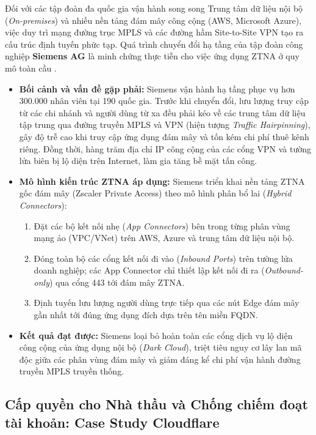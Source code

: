 Đối với các tập đoàn đa quốc gia vận hành song song Trung tâm dữ liệu nội bộ (\textit{On-premises}) và nhiều nền tảng đám mây công cộng (AWS, Microsoft Azure), việc duy trì mạng đường trục MPLS và các đường hầm Site-to-Site VPN tạo ra cấu trúc định tuyến phức tạp. Quá trình chuyển đổi hạ tầng của tập đoàn công nghiệp \textbf{Siemens AG} là minh chứng thực tiễn cho việc ứng dụng ZTNA ở quy mô toàn cầu \cite{gartner2022}.

\begin{itemize}
    \item \textbf{Bối cảnh và vấn đề gặp phải:} Siemens vận hành hạ tầng phục vụ hơn 300.000 nhân viên tại 190 quốc gia. Trước khi chuyển đổi, lưu lượng truy cập từ các chi nhánh và người dùng từ xa đều phải kéo về các trung tâm dữ liệu tập trung qua đường truyền MPLS và VPN (hiện tượng \textit{Traffic Hairpinning}), gây độ trễ cao khi truy cập ứng dụng đám mây và tốn kém chi phí thuê kênh riêng. Đồng thời, hàng trăm địa chỉ IP công cộng của các cổng VPN và tường lửa biên bị lộ diện trên Internet, làm gia tăng bề mặt tấn công.
    \item \textbf{Mô hình kiến trúc ZTNA áp dụng:} Siemens triển khai nền tảng ZTNA gốc đám mây (Zscaler Private Access) theo mô hình phân bổ lai (\textit{Hybrid Connectors}):
    \begin{enumerate}
        \item Đặt các bộ kết nối nhẹ (\textit{App Connectors}) bên trong từng phân vùng mạng ảo (VPC/VNet) trên AWS, Azure và trung tâm dữ liệu nội bộ.
        \item Đóng toàn bộ các cổng kết nối đi vào (\textit{Inbound Ports}) trên tường lửa doanh nghiệp; các App Connector chỉ thiết lập kết nối đi ra (\textit{Outbound-only}) qua cổng 443 tới đám mây ZTNA.
        \item Định tuyến lưu lượng người dùng trực tiếp qua các nút Edge đám mây gần nhất tới đúng ứng dụng đích dựa trên tên miền FQDN.
    \end{enumerate}
    \item \textbf{Kết quả đạt được:} Siemens loại bỏ hoàn toàn các cổng dịch vụ lộ diện công cộng của ứng dụng nội bộ (\textit{Dark Cloud}), triệt tiêu nguy cơ lây lan mã độc giữa các phân vùng đám mây và giảm đáng kể chi phí vận hành đường truyền MPLS truyền thống.
\end{itemize}

\subsection{Cấp quyền cho Nhà thầu và Chống chiếm đoạt tài khoản: Case Study Cloudflare}
\label{subsec:5_1_3}

